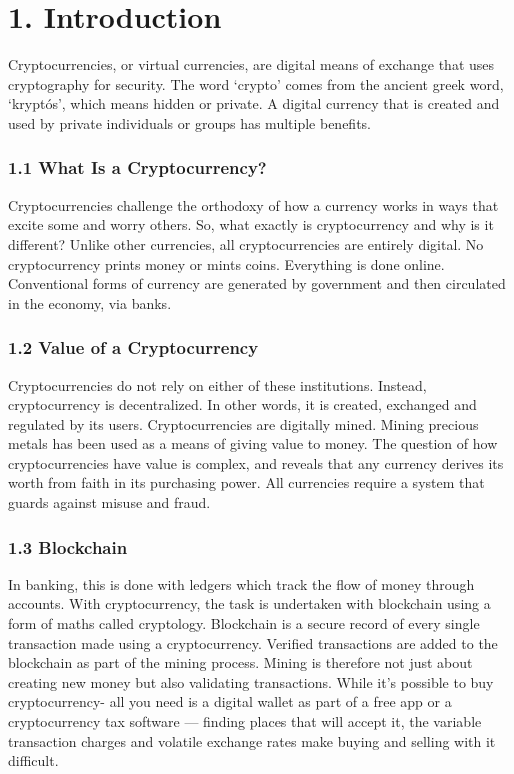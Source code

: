 \chapter*{1. Introduction}
	 Cryptocurrencies, or virtual currencies, are digital means of exchange that uses cryptography for security. The word ‘crypto’ comes from the ancient greek word, ‘kryptós’, which means hidden or private. A digital currency that is created and used by private individuals or groups has multiple benefits.\vspace{.3cm}
	 
	 \subsection*{1.1 What Is a Cryptocurrency?}
	 
	 Cryptocurrencies challenge the orthodoxy of how a currency works in ways that excite some and worry others. So, what exactly is cryptocurrency and why is it different? Unlike other currencies, all cryptocurrencies are entirely digital. No cryptocurrency prints money or mints coins. Everything is done online. Conventional forms of currency are generated by government and then circulated in the economy, via banks.\vspace{.3cm}
	 
	 \subsection*{1.2 Value of a Cryptocurrency}
	 
	 Cryptocurrencies do not rely on either of these institutions. Instead, cryptocurrency is decentralized. In other words, it is created, exchanged and regulated by its users. Cryptocurrencies are digitally mined. Mining precious metals has been used as a means of giving value to money. The question of how cryptocurrencies have value is complex, and reveals that any currency derives its worth from faith in its purchasing power. All currencies require a system that guards against misuse and fraud.\vspace{.3cm}
	 
	 \subsection*{1.3 Blockchain}
	 
	 In banking, this is done with ledgers which track the flow of money through accounts. With cryptocurrency, the task is undertaken with blockchain using a form of maths called cryptology. Blockchain is a secure record of every single transaction made using a cryptocurrency. Verified transactions are added to the blockchain as part of the mining process. Mining is therefore not just about creating new money but also validating transactions. While it’s possible to buy cryptocurrency- all you need is a digital wallet as part of a free app or a cryptocurrency tax software — finding places that will accept it, the variable transaction charges and volatile exchange rates make buying and selling with it difficult.\vspace{.3cm}

